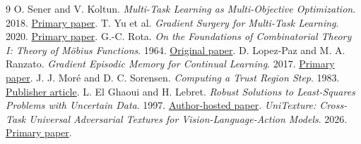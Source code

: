 \documentclass[10pt,a4paper]{article}
\begin{document}
\begin{thebibliography}{9}\small
\setlength{\itemsep}{3pt}
 O. Sener and V. Koltun. \emph{Multi-Task Learning as Multi-Objective
Optimization}. 2018. \href{https://arxiv.org/abs/1810.04650}{Primary paper}.
 T. Yu et al. \emph{Gradient Surgery for Multi-Task Learning}.
2020. \href{https://arxiv.org/abs/2001.06782}{Primary paper}.
 G.-C. Rota. \emph{On the Foundations of Combinatorial Theory I:
Theory of M\"obius Functions}. 1964.
\href{https://webhomes.maths.ed.ac.uk/~v1ranick/papers/rota1.pdf}{Original paper}.
 D. Lopez-Paz and M. A. Ranzato. \emph{Gradient Episodic Memory
for Continual Learning}. 2017. \href{https://arxiv.org/abs/1706.08840}{Primary paper}.
 J. J. Mor\'e and D. C. Sorensen. \emph{Computing a Trust Region
Step}. 1983. \href{https://epubs.siam.org/doi/10.1137/0904038}{Publisher article}.
 L. El Ghaoui and H. Lebret. \emph{Robust Solutions to
Least-Squares Problems with Uncertain Data}. 1997.
\href{https://people.eecs.berkeley.edu/~elghaoui/Pubs/rob-ls.pdf}{Author-hosted paper}.
 \emph{UniTexture: Cross-Task Universal Adversarial Textures
for Vision-Language-Action Models}. 2026.
\href{https://arxiv.org/html/2608.13453v1}{Primary paper}.
\end{thebibliography}
\end{document}
